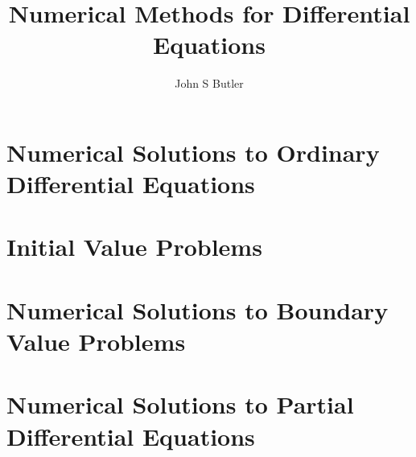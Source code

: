 \documentclass[
  oneside,
  11pt, a4paper,
  footinclude=true,
  headinclude=true,
  cleardoublepage=empty
]{scrbook}
\title{Numerical Methods for Differential Equations}
\author{John S Butler}
\date{}
\begin{document}

%
%
%
%




%

%

\part{Numerical Solutions to Ordinary Differential Equations}
\part{Initial Value Problems}







\part{Numerical Solutions to Boundary Value Problems}

\part{Numerical Solutions to Partial Differential Equations}











\printindex
\end{document}
